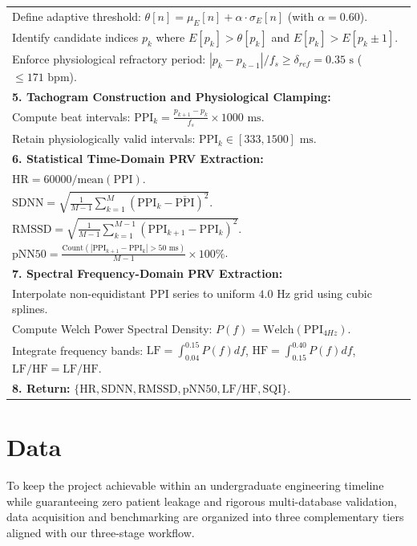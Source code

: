 \begin{table}[!htbp]
\begin{tabular}{|p{13.5cm}|}
		\quad Define adaptive threshold: $\theta[n] = \mu_E[n] + \alpha \cdot \sigma_E[n]$ (with $\alpha = 0.60$).\\
		\quad Identify candidate indices $p_k$ where $E[p_k] > \theta[p_k]$ and $E[p_k] > E[p_k \pm 1]$.\\
		\quad Enforce physiological refractory period: $|p_k - p_{k-1}|/f_s \ge \delta_{ref} = 0.35\text{ s}$ ($\le 171\text{ bpm}$).\\
		\textbf{5. Tachogram Construction and Physiological Clamping:} \\
		\quad Compute beat intervals: $\text{PPI}_k = \frac{p_{k+1} - p_k}{f_s} \times 1000\text{ ms}$.\\
		\quad Retain physiologically valid intervals: $\text{PPI}_k \in [333, 1500]\text{ ms}$.\\
		\textbf{6. Statistical Time-Domain PRV Extraction:} \\
		\quad $\text{HR} = 60000 / \text{mean}(\text{PPI})$.\\
		\quad $\text{SDNN} = \sqrt{\frac{1}{M-1}\sum_{k=1}^M (\text{PPI}_k - \overline{\text{PPI}})^2}$.\\
		\quad $\text{RMSSD} = \sqrt{\frac{1}{M-1}\sum_{k=1}^{M-1} (\text{PPI}_{k+1} - \text{PPI}_k)^2}$.\\
		\quad $\text{pNN50} = \frac{\text{Count}(|\text{PPI}_{k+1} - \text{PPI}_k| > 50\text{ ms})}{M-1} \times 100\%$.\\
		\textbf{7. Spectral Frequency-Domain PRV Extraction:} \\
		\quad Interpolate non-equidistant $\text{PPI}$ series to uniform $4.0\text{ Hz}$ grid using cubic splines.\\
		\quad Compute Welch Power Spectral Density: $P(f) = \text{Welch}(\text{PPI}_{4Hz})$.\\
		\quad Integrate frequency bands: $\text{LF} = \int_{0.04}^{0.15} P(f)df$, $\text{HF} = \int_{0.15}^{0.40} P(f)df$, $\text{LF/HF} = \text{LF} / \text{HF}$.\\
		\textbf{8. Return:} $\{\text{HR}, \text{SDNN}, \text{RMSSD}, \text{pNN50}, \text{LF/HF}, \text{SQI}\}$.\\
		\hline
	\end{tabular}
\end{table}

\section{Data}

To keep the project achievable within an undergraduate engineering timeline while guaranteeing zero patient leakage and rigorous multi-database validation, data acquisition and benchmarking are organized into three complementary tiers aligned with our three-stage workflow.

